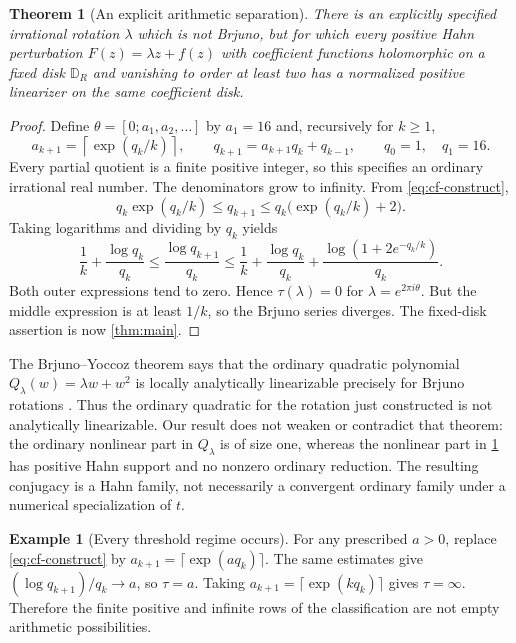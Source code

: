\documentclass[11pt,letterpaper]{article}
\newtheorem{theorem}{Theorem}[section]
\theoremstyle{definition}
\newtheorem{example}[example]{Example}
\theoremstyle{remark}
\numberwithin{equation}{section}
\begin{document}
\begin{theorem}[An explicit arithmetic separation]\label{thm:nonbrjuno}
There is an explicitly specified irrational rotation $\lambda$ which is not
Brjuno, but for which every positive Hahn perturbation
$F(z)=\lambda z+f(z)$ with coefficient functions holomorphic on a fixed disk
$\mathbb D_R$ and vanishing to order at least two has a normalized positive
linearizer on the \emph{same} coefficient disk.
\end{theorem}
\begin{proof}
Define $\theta=[0;a_1,a_2,\ldots]$ by $a_1=16$ and, recursively for
$k\ge1$,
\begin{equation}\label{eq:cf-construct}
 a_{k+1}=\left\lceil\exp(q_k/k)\right\rceil,\qquad
 q_{k+1}=a_{k+1}q_k+q_{k-1},\qquad q_0=1,\quad q_1=16.
\end{equation}
Every partial quotient is a finite positive integer, so this specifies an
ordinary irrational real number. The denominators grow to infinity. From
\eqref{eq:cf-construct},
\[
 q_k\exp(q_k/k)\le q_{k+1}
      \le q_k\bigl(\exp(q_k/k)+2\bigr).
\]
Taking logarithms and dividing by $q_k$ yields
\[
 \frac1k+\frac{\log q_k}{q_k}
 \le\frac{\log q_{k+1}}{q_k}
 \le\frac1k+\frac{\log q_k}{q_k}
       +\frac{\log(1+2e^{-q_k/k})}{q_k}.
\]
Both outer expressions tend to zero. Hence $\tau(\lambda)=0$ for
$\lambda=e^{2\pi i\theta}$. But the middle expression is at least $1/k$,
so the Brjuno series diverges. The fixed-disk assertion is now
\cref{thm:main}.
\end{proof}

The Brjuno--Yoccoz theorem says that the ordinary quadratic polynomial
$Q_\lambda(w)=\lambda w+w^2$ is locally analytically linearizable precisely
for Brjuno rotations \cite{Yoccoz,BuffCheritat}. Thus the ordinary quadratic
for the rotation just constructed is not analytically linearizable. Our
result does not weaken or contradict that theorem: the ordinary nonlinear
part in $Q_\lambda$ is of size one, whereas the nonlinear part in
\cref{thm:nonbrjuno} has positive Hahn support and no nonzero ordinary
reduction. The resulting conjugacy is a Hahn family, not necessarily a
convergent ordinary family under a numerical specialization of $t$.

\begin{example}[Every threshold regime occurs]
For any prescribed $a>0$, replace \eqref{eq:cf-construct} by
$a_{k+1}=\lceil\exp(aq_k)\rceil$. The same estimates give
$(\log q_{k+1})/q_k\to a$, so $\tau=a$.
Taking $a_{k+1}=\lceil\exp(kq_k)\rceil$ gives $\tau=\infty$.
Therefore the finite positive and infinite rows of the classification are
not empty arithmetic possibilities.
\end{example}
\end{document}
